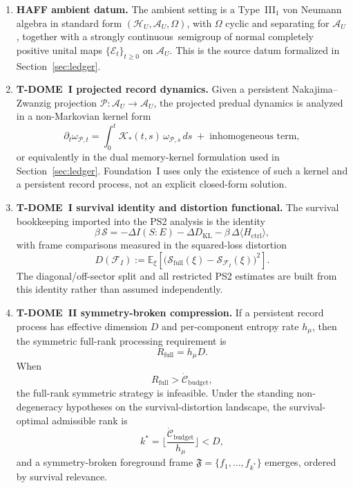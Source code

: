 \documentclass[12pt]{article}
\theoremstyle{definition}
\theoremstyle{remark}
\providecommand{\FIAppendixContinuityPhrase}{strongly continuous}
\begin{document}
\begin{enumerate}
\item \textbf{HAFF ambient datum.}
The ambient setting is a Type~III\(_1\) von Neumann algebra in standard
form \((\mathcal H_U,\mathcal A_U,\Omega)\), with \(\Omega\) cyclic and
separating for \(\mathcal A_U\), together with a
\FIAppendixContinuityPhrase\ semigroup of normal completely positive
unital maps \(\{\mathcal E_t\}_{t\ge 0}\) on \(\mathcal A_U\). This is
the source datum formalized in Section~\ref{sec:ledger}.

\item \textbf{T-DOME~I projected record dynamics.}
Given a persistent Nakajima--Zwanzig projection
\(\mathcal P:\mathcal A_U\to\mathcal A_U\), the projected predual
dynamics is analyzed in a non-Markovian kernel form
\[
\partial_t \omega_{\mathcal P,t}
=
\int_0^t \mathcal K_*(t,s)\,\omega_{\mathcal P,s}\,ds
\;+\; \text{inhomogeneous term},
\]
or equivalently in the dual memory-kernel formulation used in
Section~\ref{sec:ledger}. Foundation~I uses only the existence of such a
kernel and a persistent record process, not an explicit closed-form
solution.

\item \textbf{T-DOME~I survival identity and distortion functional.}
The survival bookkeeping imported into the PS2 analysis is the identity
\[
\beta\,\mathcal S
=
-\Delta I(S{:}E)
-\Delta D_{\mathrm{KL}}
-\beta\,\Delta\langle H_{\mathrm{ctrl}}\rangle,
\]
with frame comparisons measured in the squared-loss distortion
\[
D(\mathcal F_I)
:=
\mathbb E_\xi\!\left[
\bigl(
\mathcal S_{\mathrm{full}}(\xi)
-\mathcal S_{\mathcal F_I}(\xi)
\bigr)^2
\right].
\]
The diagonal/off-sector split and all restricted PS2 estimates are built
from this identity rather than assumed independently.

\item \textbf{T-DOME~II symmetry-broken compression.}
If a persistent record process has effective dimension \(D\) and
per-component entropy rate \(h_\mu\), then the symmetric full-rank
processing requirement is
\[
R_{\mathrm{full}}=h_\mu D.
\]
When
\[
R_{\mathrm{full}}
>
\dot{\mathcal C}_{\mathrm{budget}},
\]
the full-rank symmetric strategy is infeasible. Under the standing
non-degeneracy hypotheses on the survival-distortion landscape, the
survival-optimal admissible rank is
\[
k^*
=
\Big\lfloor
\frac{\dot{\mathcal C}_{\mathrm{budget}}}{h_\mu}
\Big\rfloor
< D,
\]
and a symmetry-broken foreground frame
\(\mathfrak F=\{f_1,\dots,f_{k^*}\}\) emerges, ordered by survival
relevance.


\end{enumerate}
\end{document}
